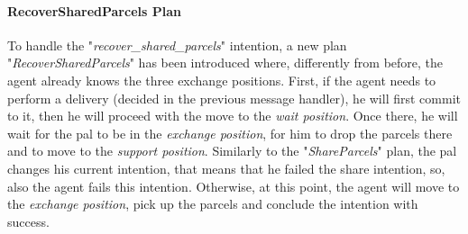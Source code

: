                 \paragraph{RecoverSharedParcels Plan}
                    To handle the "\textit{recover\_shared\_parcels}" intention, a new plan "\textit{RecoverSharedParcels}" has been introduced where, differently from before, the agent already knows the three exchange positions. First, if the agent needs to perform a delivery (decided in the previous message handler), he will first commit to it, then he will proceed with the move to the \textit{wait position}. Once there, he will wait for the pal to be in the \textit{exchange position}, for him to drop the parcels there and to move to the \textit{support position}. Similarly to the "\textit{ShareParcels}" plan, the pal changes his current intention, that means that he failed the share intention, so, also the agent fails this intention. Otherwise, at this point, the agent will move to the \textit{exchange position}, pick up the parcels and conclude the intention with success.        
